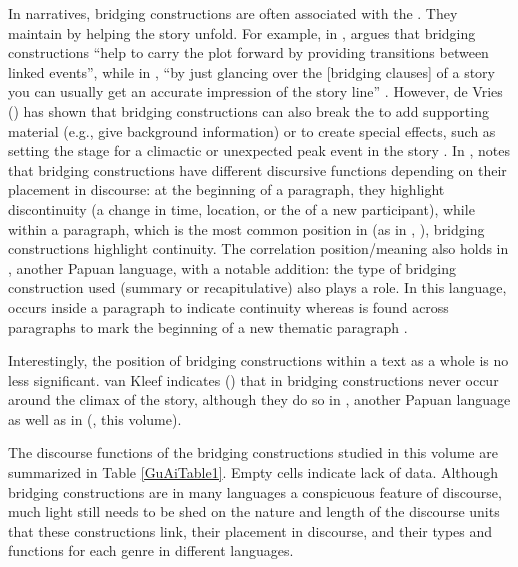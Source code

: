 \documentclass[output=paper]{LSP/langsci}
\begin{document}
In narratives, bridging constructions are often associated with the . They maintain  by helping the story unfold. For example, in , \citet[][1324]{Jendraschek09} argues that bridging constructions ``help to carry the plot forward by providing transitions between linked events'', while in , ``by just glancing over the [bridging clauses] of a story you can usually get an accurate impression of the story line''  \citep[][153]{kleef88}.  However, de Vries (\citeyear{devries.2005, devries.2006}) has shown that bridging constructions can also break the  to add supporting material (e.g., give background information) or to create special effects, such as setting the stage for a climactic or unexpected peak event in the story  \citep[][373]{devries.2005}. In ,  \citet[][151--152]{kleef88} notes that bridging constructions have different discursive functions depending on their placement in discourse: at the beginning of a paragraph, they highlight discontinuity (a change in time, location, or the  of a new participant), while within a paragraph, which is the most common position in  (as in , \citealt[][123]{Guillaume2011}), bridging constructions highlight continuity. The correlation position\slash meaning also holds in , another Papuan language, with a notable addition: the type of bridging construction used (summary or recapitulative) also plays a role. In this language,  occurs inside a paragraph to indicate continuity whereas  is found across paragraphs to mark the beginning of a new thematic paragraph \citep[][23--30]{logan08}.

Interestingly, the position of bridging constructions within a text as a whole is no less significant. van Kleef indicates (\citeyear[][152]{kleef88}) that in  bridging constructions never occur around the climax of the story, although they do so in , another Papuan language as well as in  (\citeauthor{guerinchap18}, this volume). 

The discourse functions of the bridging constructions studied in this volume are summarized in Table \ref{GuAiTable1}. Empty cells indicate lack of data. Although bridging constructions are in many languages a conspicuous feature of discourse, much light still needs to be shed on the nature and length of the discourse units that these constructions link, their placement in discourse, and their types and functions for each genre in different languages.
\end{document}

